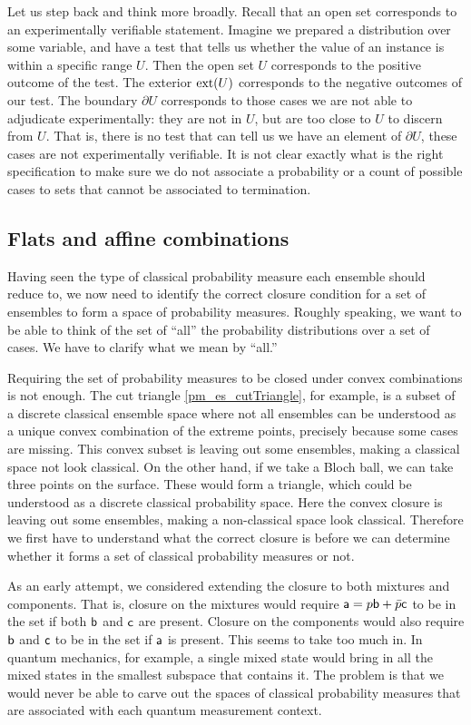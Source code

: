 Let us step back and think more broadly. Recall that an open set corresponds to an experimentally verifiable statement. Imagine we prepared a distribution over some variable, and have a test that tells us whether the value of an instance is within a specific range $U$. Then the open set $U$ corresponds to the positive outcome of the test. The exterior $\exterior(U)$ corresponds to the negative outcomes of our test. The boundary $\partial U$ corresponds to those cases we are not able to adjudicate experimentally: they are not in $U$, but are too close to $U$ to discern from $U$. That is, there is no test that can tell us we have an element of $\partial U$, these cases are not experimentally verifiable. It is not clear exactly what is the right specification to make sure we do not associate a probability or a count of possible cases to sets that cannot be associated to termination.

\subsection{Flats and affine combinations}

Having seen the type of classical probability measure each ensemble should reduce to, we now need to identify the correct closure condition for a set of ensembles to form a space of probability measures. Roughly speaking, we want to be able to think of the set of ``all'' the probability distributions over a set of cases. We have to clarify what we mean by ``all.''

Requiring the set of probability measures to be closed under convex combinations is not enough. The cut triangle \ref{pm_es_cutTriangle}, for example, is a subset of a discrete classical ensemble space where not all ensembles can be understood as a unique convex combination of the extreme points, precisely because some cases are missing. This convex subset is leaving out some ensembles, making a classical space not look classical. On the other hand, if we take a Bloch ball, we can take three points on the surface. These would form a triangle, which could be understood as a discrete classical probability space. Here the convex closure is leaving out some ensembles, making a non-classical space look classical. Therefore we first have to understand what the correct closure is before we can determine whether it forms a set of classical probability measures or not.

As an early attempt, we considered extending the closure to both mixtures and components. That is, closure on the mixtures would require $\ens[a] = p \ens[b] + \bar{p} \ens[c]$ to be in the set if both $\ens[b]$ and $\ens[c]$ are present. Closure on the components would also require $\ens[b]$ and $\ens[c]$ to be in the set if $\ens[a]$ is present. This seems to take too much in. In quantum mechanics, for example, a single mixed state would bring in all the mixed states in the smallest subspace that contains it. The problem is that we would never be able to carve out the spaces of classical probability measures that are associated with each quantum measurement context.


